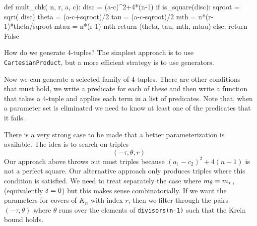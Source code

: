\begin{sageblock}
    def mult_chk( n, r, a, c):
        disc = (a-c)^2+4*(n-1)
        if is_square(disc):
            sqroot = sqrt( disc)
            theta = (a-c+sqroot)/2
            tau = (a-c-sqroot)/2
            mth = n*(r-1)*theta/sqroot
            mtau = n*(r-1)-mth
            return (theta, tau, mth, mtau)
        else:
            return False
\end{sageblock}

How do we generate 4-tuples? The simplest approach is to use \verb|CartesianProduct|,
but a more efficient strategy is to use generators.

Now we can generate a selected family of 4-tuples. There are other conditions
that must hold, we write a predicate for each of these and then write
a function that takes a 4-tuple and applies each term in a list of
predicates. Note that, when a parameter set is eliminated we need to know
at least one of the predicates that it fails.

There is a very strong case to be made that a better parameterization is available.
The idea is to search on triples
\[
    (-\tau,\theta, r)
\]
Our approach above throws out most triples because $(a_1-c_2)^2+4(n-1)$ is not
a perfect square. Our alternative approach only produces triples where
this condition is satisfied. We need to treat separately the case where
$m_\theta=m_\tau$, (equivalently $\delta=0$) but this makes sense combinatorially. 
If we want the parameters for covers of $K_n$ with index $r$, then we filter
through the pairs $(-\tau, \theta)$ where $\theta$ runs over the elements
of \verb|divisors(n-1)| such that the Krein bound holds.